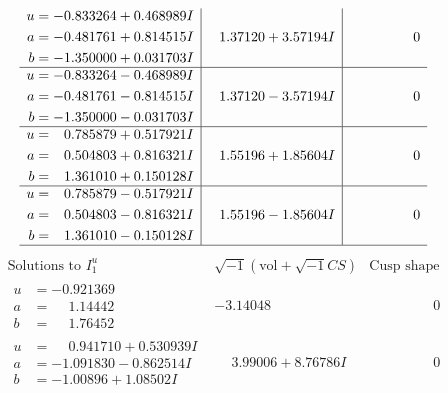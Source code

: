 \documentclass[1p]{elsarticle_modified}
\theoremstyle{definition}
\newcommand{\I}{\sqrt{-1}}
\begin{document}
$$\begin{array}{c|c|c}
\begin{aligned}
u &= -0.833264 + 0.468989 I \\
a &= -0.481761 + 0.814515 I \\
b &= -1.350000 + 0.031703 I\end{aligned}
 & \phantom{-}1.37120 + 3.57194 I & \phantom{-0.000000 } 0 \\ \hline\begin{aligned}
u &= -0.833264 - 0.468989 I \\
a &= -0.481761 - 0.814515 I \\
b &= -1.350000 - 0.031703 I\end{aligned}
 & \phantom{-}1.37120 - 3.57194 I & \phantom{-0.000000 } 0 \\ \hline\begin{aligned}
u &= \phantom{-}0.785879 + 0.517921 I \\
a &= \phantom{-}0.504803 + 0.816321 I \\
b &= \phantom{-}1.361010 + 0.150128 I\end{aligned}
 & \phantom{-}1.55196 + 1.85604 I & \phantom{-0.000000 } 0 \\ \hline\begin{aligned}
u &= \phantom{-}0.785879 - 0.517921 I \\
a &= \phantom{-}0.504803 - 0.816321 I \\
b &= \phantom{-}1.361010 - 0.150128 I\end{aligned}
 & \phantom{-}1.55196 - 1.85604 I & \phantom{-0.000000 } 0\\
 \hline 
 \end{array}$$\newpage$$\begin{array}{c|c|c}  
\text{Solutions to }I^u_{1}& \I (\text{vol} + \sqrt{-1}CS) & \text{Cusp shape}\\
 \hline 
\begin{aligned}
u &= -0.921369\phantom{ +0.000000I} \\
a &= \phantom{-}1.14442\phantom{ +0.000000I} \\
b &= \phantom{-}1.76452\phantom{ +0.000000I}\end{aligned}
 & -3.14048\phantom{ +0.000000I} & \phantom{-0.000000 } 0 \\ \hline\begin{aligned}
u &= \phantom{-}0.941710 + 0.530939 I \\
a &= -1.091830 - 0.862514 I \\
b &= -1.00896 + 1.08502 I\end{aligned}
 & \phantom{-}3.99006 + 8.76786 I & \phantom{-0.000000 } 0 \\ \hline\begin{aligned}

\end{aligned}
\end{array}$$
\end{document}
